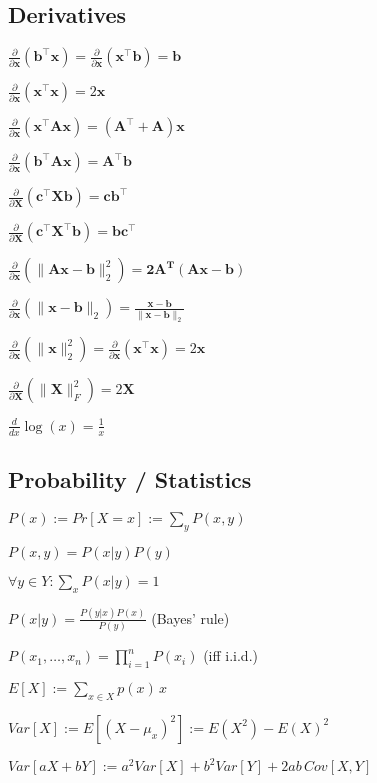\subsection*{Derivatives}
\begin{inparaitem}[\color{red}\textbullet]
\item $\frac{\partial}{\partial \mathbf{x}}(\mathbf{b}^\top \mathbf{x}) = \frac{\partial}{\partial \mathbf{x}}(\mathbf{x}^\top \mathbf{b}) = \mathbf{b}$
\item $\frac{\partial}{\partial \mathbf{x}}(\mathbf{x}^\top \mathbf{x}) = 2\mathbf{x}$
\item $\frac{\partial}{\partial \mathbf{x}}(\mathbf{x}^\top \mathbf{A}\mathbf{x}) = (\mathbf{A}^\top + \mathbf{A})\mathbf{x}$ 
\item $\frac{\partial}{\partial \mathbf{x}}(\mathbf{b}^\top \mathbf{A}\mathbf{x}) = \mathbf{A}^\top \mathbf{b}$
\item $\frac{\partial}{\partial \mathbf{X}}(\mathbf{c}^\top \mathbf{X} \mathbf{b}) = \mathbf{c}\mathbf{b}^\top$ 
\item $\frac{\partial}{\partial \mathbf{X}}(\mathbf{c}^\top \mathbf{X}^\top \mathbf{b}) = \mathbf{b}\mathbf{c}^\top$
\item $\frac{\partial}{\partial \mathbf{x}}(\| \mathbf{Ax}-\mathbf{b} \|^2_2) = \mathbf{2A^T(Ax -b)}$
\item $\frac{\partial}{\partial \mathbf{x}}(\| \mathbf{x}-\mathbf{b} \|_2) = \frac{\mathbf{x}-\mathbf{b}}{\|\mathbf{x}-\mathbf{b}\|_2}$ 
\item $\frac{\partial}{\partial \mathbf{x}}(\|\mathbf{x}\|^2_2) = \frac{\partial}{\partial \mathbf{x}} (\mathbf{x}^\top \mathbf{x}) = 2\mathbf{x}$
\item $\frac{\partial}{\partial \mathbf{X}}(\|\mathbf{X}\|_F^2) = 2\mathbf{X}$ 
\item $\frac{d}{dx}\log(x) = \frac{1}{x}$
\end{inparaitem}

\subsection*{Probability / Statistics}
\begin{inparaitem}
	\item $P(x) := Pr[X = x] := \sum_{y} P(x, y)$
	\item $P(x, y) = P(x|y) P(y)$
	\item $\forall y\in Y: \sum_{x} P(x|y) = 1$\\
	\item $P(x|y) = \frac{P(y|x)P(x)}{P(y)}$ (Bayes' rule)
	\item $P(x_1, \ldots, x_n) = \prod_{i=1}^n P(x_i)$ (iff i.i.d.)
	\item $E[X]:=\sum_{x \in X}p(x)\,x$
	\item $Var[X]:= E[(X-\mu_x)^2]:= E(X^2) - E(X)^2$
	\item $Var[aX + bY]:= a^2Var[X] + b^2Var[Y] +2ab\, Cov[X,Y]$
\end{inparaitem}


